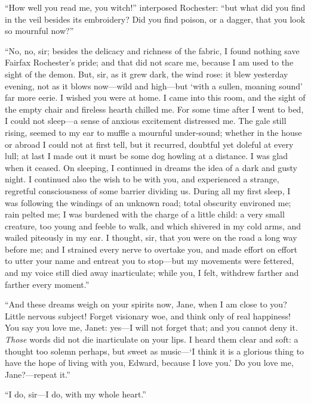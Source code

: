 \enquote{How well you read me, you witch!} interposed \Mr{} Rochester:
\enquote{but what did you find in the veil besides its embroidery?  Did
you find poison, or a dagger, that you look so mournful now?}

\enquote{No, no, sir; besides the delicacy and richness of the fabric, I
found nothing save Fairfax Rochester's pride; and that did not scare me,
because I am used to the sight of the demon.  But, sir, as it grew dark,
the wind rose: it blew yesterday evening, not as it blows now---wild and
high---but \enquote{with a sullen, moaning sound} far more eerie.  I
wished you were at home.  I came into this room, and the sight of the
empty chair and fireless hearth chilled me.  For some time after I went
to bed, I could not sleep---a sense of anxious excitement distressed
me.  The gale still rising, seemed to my ear to muffle a mournful
under-sound; whether in the house or abroad I could not at first tell,
but it recurred, doubtful yet doleful at every lull; at last I made out
it must be some dog howling at a distance.  I was glad when it ceased. 
On sleeping, I continued in dreams the idea of a dark and gusty night. 
I continued also the wish to be with you, and experienced a strange,
regretful consciousness of some barrier dividing us.  During all my
first sleep, I was following the windings of an unknown road; total
obscurity environed me; rain pelted me; I was burdened with the charge
of a little child: a very small creature, too young and feeble to walk,
and which shivered in my cold arms, and wailed piteously in my ear.  I
thought, sir, that you were on the road a long way before me; and I
strained every nerve to overtake you, and made effort on effort to utter
your name and entreat you to stop---but my movements were fettered, and
my voice still died away inarticulate; while you, I felt, withdrew
farther and farther every moment.}

\enquote{And these dreams weigh on your spirits now, Jane, when I am close to
you?  Little nervous subject!  Forget visionary woe, and think only of
real happiness!  You say you love me, Janet: yes---I will not forget
that; and you cannot deny it.  \emph{Those} words did not die
inarticulate on your lips.  I heard them clear and soft: a thought too
solemn perhaps, but sweet as music---\enquote{I think it is a glorious thing to
have the hope of living with you, Edward, because I love you.}  Do you
love me, Jane?---repeat it.}

\enquote{I do, sir---I do, with my whole heart.}

